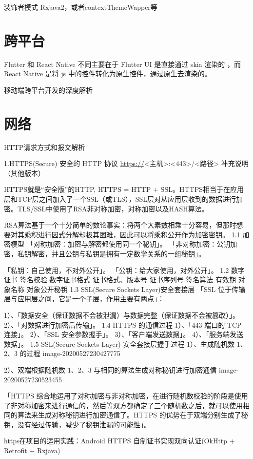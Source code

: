 \documentclass[9pt, b5paper]{article}
\begin{document}
装饰者模式
Rxjava2，或者contextThemeWapper等

\section{跨平台}
\label{sec-16}
Flutter 和 React Native 不同主要在于 Flutter UI 是直接通过 skia 渲染的 ，而 React Native 是将 js 中的控件转化为原生控件，通过原生去渲染的。

移动端跨平台开发的深度解析

\section{网络}
\label{sec-17}
HTTP请求方式和报文解析

1.HTTPS(Secure) 安全的 HTTP 协议
\url{https://}<主机>:<443>/<路径>
补充说明（其他版本）

HTTPS就是“安全版”的HTTP, HTTPS = HTTP + SSL。HTTPS相当于在应用层和TCP层之间加入了一个SSL（或TLS），SSL层对从应用层收到的数据进行加密。TLS/SSL中使用了RSA非对称加密，对称加密以及HASH算法。

RSA算法基于一个十分简单的数论事实：将两个大素数相乘十分容易，但那时想要对其乘积进行因式分解却极其困难，因此可以将乘积公开作为加密密钥。
1.1 加密模型
「对称加密：加密与解密都使用同一个秘钥」。
「非对称加密：公钥加密，私钥解密，并且公钥与私钥是拥有一定数学关系的一组秘钥」。

「私钥：自己使用，不对外公开」。
「公钥：给大家使用，对外公开」。
1.2 数字证书 签名校验
数字证书格式
证书格式、版本号
证书序列号
签名算法
有效期
对象名称
对象公开秘钥
1.3 SSL(Secure Sockets Layer)安全套接层
「SSL 位于传输层与应用层之间，它是一个子层，作用主要有两点」：

1）、「数据安全（保证数据不会被泄漏）与数据完整（保证数据不会被篡改）」。
2）、「对数据进行加密后传输」。
1.4 HTTPS 的通信过程
1）、「443 端口的 TCP 连接」。
2）、「SSL 安全参数握手」。
3）、「客户端发送数据」。
4）、「服务端发送数据」。
1.5 SSL(Secure Sockets Layer) 安全套接层握手过程
1）、生成随机数 1、2、3 的过程
image-20200527230427775

2）、双端根据随机数 1、2、3 与相同的算法生成对称秘钥进行加密通信
image-20200527230523455

「HTTPS 综合地运用了对称加密与非对称加密，在进行随机数校验的阶段是使用了非对称加密来进行通信的，然后等双方都确定了三个随机数之后，就可以使用相同的算法来生成对称秘钥进行加密通信了。HTTPS 的优势在于双端分别生成了秘钥，没有经过传输，减少了秘钥泄漏的可能性」。

https在项目的运用实践：Android HTTPS 自制证书实现双向认证(OkHttp + Retrofit + Rxjava)
\end{document}
